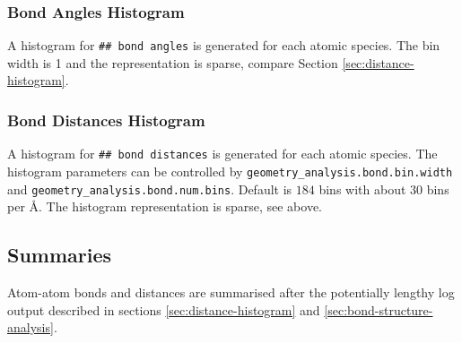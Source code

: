 \documentclass[oribibl]{llncs}
\newcommand{\ttt}[1]{\texttt{#1}}
\begin{document}
\subsubsection{Bond Angles Histogram} \label{sec:bond-angle-histogram}
A histogram for \ttt{\#\# bond angles} is generated for each atomic species.
The bin width is 1\degree{} and the representation is sparse,
compare Section \ref{sec:distance-histogram}.

\subsubsection{Bond Distances Histogram} \label{sec:bond-distance-histogram}
A histogram for \ttt{\#\# bond distances} is generated for each atomic species.
The histogram parameters can be controlled by 
\ttt{geometry\_analysis.bond.bin.width} and 
\ttt{geometry\_analysis.bond.num.bins}. Default is $184$ bins with about $30$ bins per \AA{}.
The histogram representation is sparse, see above.

\subsection{Summaries}
%
Atom-atom bonds and distances are summarised after the potentially lengthy log output described in
sections \ref{sec:distance-histogram} and \ref{sec:bond-structure-analysis}.
\end{document}
